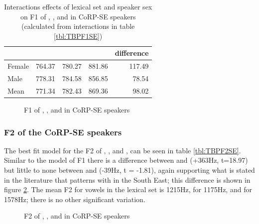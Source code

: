 \documentclass[../../00.FullDoc/tex/Thesis]{subfiles}
\begin{document}
\begin{table}[htbp]
	\centering
	\begin{tabular}{lrrrr}
		\hline
		& \multicolumn{1}{l}{\bath{}} & \multicolumn{1}{l}{\palm{}} & \multicolumn{1}{l}{\trap{}} & \multicolumn{1}{l}{\TB{} difference} \\
		\hline
		Female & 764.37 & \cellcolor[rgb]{ .816,  .808,  .808} 780.27 & 881.86 & 117.49 \\
		Male  & 778.31 & \cellcolor[rgb]{ .816,  .808,  .808} 784.58 & 856.85 & 78.54 \\
		Mean  & 771.34 & \cellcolor[rgb]{ .816,  .808,  .808} 782.43 & 869.36 & 98.02 \\
		\hline
	\end{tabular}
	\caption{Interactions effects of lexical set and speaker sex on F1 of \trap{}, \bath{}, and \palm{} in CoRP-SE speakers (calculated from interactions in table \ref{tbl:TBPF1SE})}
	\label{tbl:TBPF1SE-inter}
\end{table}

\begin{figure}[h]
	
	\caption{F1 of \bath{}, \palm{}, and \trap{}  in CoRP-SE speakers} \label{fig:TBPF1SE}
\end{figure}

\subsubsection{F2 of the CoRP-SE speakers}
The best fit model for the F2 of \trap{}, \bath{}, and \palm{}, can be seen in table \ref{tbl:TBPF2SE}. Similar to the model of F1 there is a difference between \bath{} and \trap{} (+363Hz, t=18.97) but little to none between \bath{} and \palm{} (-39Hz, t = -1.81), again supporting what is stated in the literature that \bath{} patterns with \palm{} in the South East; this difference is shown in figure \ref{fig:TBPF2SE}. The mean F2 for vowels in the \bath{} lexical set is 1215Hz, for \palm{} 1175Hz, and for \trap{} 1578Hz; there is no other significant variation.



\begin{figure}[h]
	
	\caption{F2 of \bath{}, \palm{}, and \trap{}  in CoRP-SE speakers} \label{fig:TBPF2SE}
\end{figure}
\end{document}
